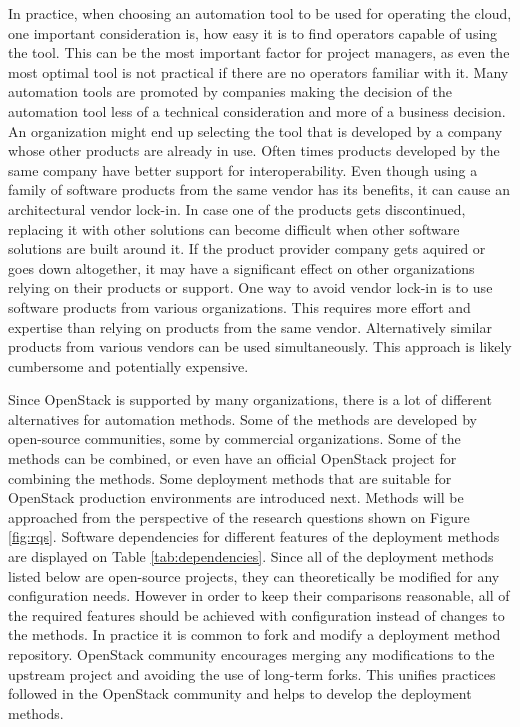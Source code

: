 In practice, when choosing an automation tool to be used for operating the
cloud, one important consideration is, how easy it is to find operators capable
of using the tool. This can be the most important factor for project managers,
as even the most optimal tool is not practical if there are no operators
familiar with it. Many automation tools are promoted by companies making the
decision of the automation tool less of a technical consideration and more of a
business decision. An organization might end up selecting the tool that is
developed by a company whose other products are already in use. Often times
products developed by the same company have better support for
interoperability. Even though using a family of software products from the same
vendor has its benefits, it can cause an architectural vendor lock-in. In case
one of the products gets discontinued, replacing it with other solutions can
become difficult when other software solutions are built around it. If the
product provider company gets aquired or goes down altogether, it may have a
significant effect on other organizations relying on their products or support.
One way to avoid vendor lock-in is to use software products from various
organizations. This requires more effort and expertise than relying on products
from the same vendor. Alternatively similar products from various vendors can
be used simultaneously. This approach is likely cumbersome and potentially
expensive.

Since OpenStack is supported by many organizations, there is a lot of different
alternatives for automation methods. Some of the methods are developed by
open-source communities, some by commercial organizations. Some of the methods
can be combined, or even have an official OpenStack project for combining the
methods. Some deployment methods that are suitable for OpenStack production
environments are introduced next. Methods will be approached from the
perspective of the research questions shown on Figure \ref{fig:rqs}. Software
dependencies for different features of the deployment methods are displayed on
Table \ref{tab:dependencies}. Since all of the deployment methods listed below
are open-source projects, they can theoretically be modified for any
configuration needs. However in order to keep their comparisons reasonable, all
of the required features should be achieved with configuration instead of
changes to the methods. In practice it is common to fork and modify a
deployment method repository. OpenStack community encourages merging any
modifications to the upstream project and avoiding the use of long-term forks.
This unifies practices followed in the OpenStack community and helps to
develop the deployment methods.

